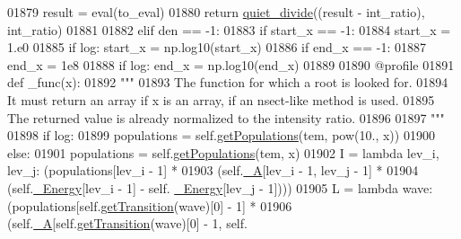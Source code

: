\begin{DoxyCode}
01879                 result = eval(to\_eval)
01880                 \textcolor{keywordflow}{return} \hyperlink{namespacepyneb_1_1utils_1_1misc_afa4163f24be7b1472200c24824c72ae1}{quiet\_divide}((result - int\_ratio), int\_ratio)
01881             
01882         \textcolor{keywordflow}{elif} den == -1:
01883             \textcolor{keywordflow}{if} start\_x == -1:
01884                 start\_x = 1.e0
01885                 \textcolor{keywordflow}{if} log: start\_x = np.log10(start\_x)
01886             \textcolor{keywordflow}{if} end\_x == -1:
01887                 end\_x = 1e8
01888                 \textcolor{keywordflow}{if} log: end\_x = np.log10(end\_x)
01889 
01890             @profile
01891             \textcolor{keyword}{def }\_func(x):
01892                 \textcolor{stringliteral}{"""}
01893 \textcolor{stringliteral}{                The function for which a root is looked for.}
01894 \textcolor{stringliteral}{                It must return an array if x is an array, if an nsect-like method is used.}
01895 \textcolor{stringliteral}{                The returned value is already normalized to the intensity ratio.}
01896 \textcolor{stringliteral}{                }
01897 \textcolor{stringliteral}{                """}
01898                 \textcolor{keywordflow}{if} log:
01899                     populations = self.\hyperlink{classpyneb_1_1core_1_1pynebcore_1_1_atom_aab7496403c8aaef40ab3b20b5c00e9f0}{getPopulations}(tem, pow(10., x))
01900                 \textcolor{keywordflow}{else}:
01901                     populations = self.\hyperlink{classpyneb_1_1core_1_1pynebcore_1_1_atom_aab7496403c8aaef40ab3b20b5c00e9f0}{getPopulations}(tem, x)
01902                 I = \textcolor{keyword}{lambda} lev\_i, lev\_j: (populations[lev\_i - 1] * 
01903                                           (self.\hyperlink{classpyneb_1_1core_1_1pynebcore_1_1_atom_aa6416fe661b8deaa008179314727e025}{\_A}[lev\_i - 1, lev\_j - 1] * 
01904                                            (self.\hyperlink{classpyneb_1_1core_1_1pynebcore_1_1_atom_a52e68715246d258bf0a14f4bd06e89e4}{\_Energy}[lev\_i - 1] - self.
      \hyperlink{classpyneb_1_1core_1_1pynebcore_1_1_atom_a52e68715246d258bf0a14f4bd06e89e4}{\_Energy}[lev\_j - 1])))
01905                 L = \textcolor{keyword}{lambda} wave: (populations[self.\hyperlink{classpyneb_1_1core_1_1pynebcore_1_1_atom_a7c9f17a3d9e841267add92377d9d1ede}{getTransition}(wave)[0] - 1] * 
01906                                   (self.\hyperlink{classpyneb_1_1core_1_1pynebcore_1_1_atom_aa6416fe661b8deaa008179314727e025}{\_A}[self.\hyperlink{classpyneb_1_1core_1_1pynebcore_1_1_atom_a7c9f17a3d9e841267add92377d9d1ede}{getTransition}(wave)[0] - 1, self.

\end{DoxyCode}
